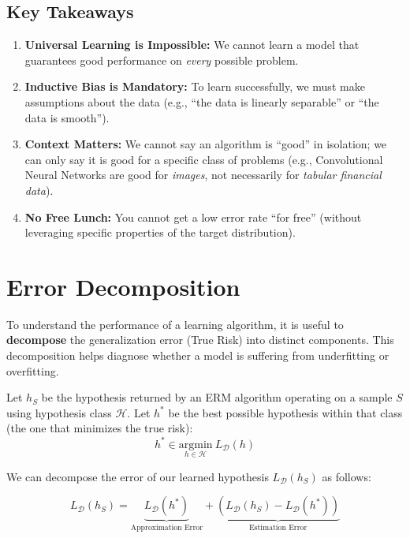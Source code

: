 \documentclass[
  italian,
  11pt,
]{article}
\providecommand{\tightlist}{%
  \setlength{\itemsep}{0pt}\setlength{\parskip}{0pt}}
\begin{document}
\subsection{Key Takeaways}\label{key-takeaways-2}

\begin{enumerate}
\def\labelenumi{\arabic{enumi}.}
\tightlist
\item
  \textbf{Universal Learning is Impossible:} We cannot learn a model
  that guarantees good performance on \emph{every} possible problem.
\item
  \textbf{Inductive Bias is Mandatory:} To learn successfully, we must
  make assumptions about the data (e.g., ``the data is linearly
  separable'' or ``the data is smooth'').
\item
  \textbf{Context Matters:} We cannot say an algorithm is ``good'' in
  isolation; we can only say it is good for a specific class of problems
  (e.g., Convolutional Neural Networks are good for \emph{images}, not
  necessarily for \emph{tabular financial data}).
\item
  \textbf{No Free Lunch:} You cannot get a low error rate ``for free''
  (without leveraging specific properties of the target distribution).
\end{enumerate}

\newpage

\section{Error Decomposition}\label{error-decomposition}

To understand the performance of a learning algorithm, it is useful to
\textbf{decompose} the generalization error (True Risk) into distinct
components. This decomposition helps diagnose whether a model is
suffering from underfitting or overfitting.

Let \(h_S\) be the hypothesis returned by an ERM algorithm operating on
a sample \(S\) using hypothesis class \(\mathcal{H}\). Let \(h^*\) be
the best possible hypothesis within that class (the one that minimizes
the true risk):
\[ h^* \in \underset{h \in \mathcal{H}}{\text{argmin}} \ L_{\mathcal{D}}(h) \]

We can decompose the error of our learned hypothesis
\(L_{\mathcal{D}}(h_S)\) as follows:

\[ L_{\mathcal{D}}(h_S) = \underbrace{L_{\mathcal{D}}(h^*)}_{\text{Approximation Error}} + \underbrace{(L_{\mathcal{D}}(h_S) - L_{\mathcal{D}}(h^*))}_{\text{Estimation Error}} \]
\end{document}

